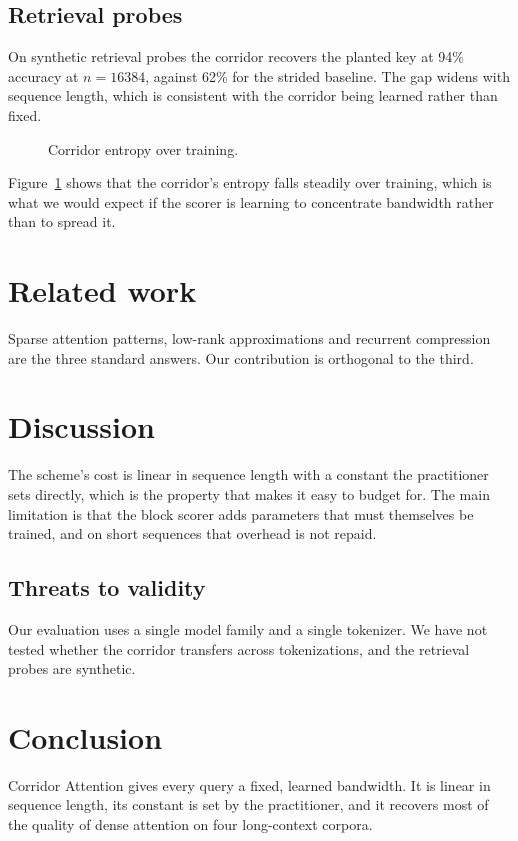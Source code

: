 \documentclass[11pt,twocolumn]{article}
\begin{document}
\subsection{Retrieval probes}
On synthetic retrieval probes the corridor recovers the planted key at 94\%
accuracy at $n=16384$, against 62\% for the strided baseline. The gap widens
with sequence length, which is consistent with the corridor being learned rather
than fixed.

\begin{figure}[t]
\centering
{}
\caption{Corridor entropy over training.}
\label{fig:entropy}
\end{figure}

Figure~\ref{fig:entropy} shows that the corridor's entropy falls steadily over
training, which is what we would expect if the scorer is learning to concentrate
bandwidth rather than to spread it.

\section{Related work}
Sparse attention patterns, low-rank approximations and recurrent compression are
the three standard answers. Our contribution is orthogonal to the third.

\section{Discussion}
The scheme's cost is linear in sequence length with a constant the practitioner
sets directly, which is the property that makes it easy to budget for. The main
limitation is that the block scorer adds parameters that must themselves be
trained, and on short sequences that overhead is not repaid.

\subsection{Threats to validity}
Our evaluation uses a single model family and a single tokenizer. We have not
tested whether the corridor transfers across tokenizations, and the retrieval
probes are synthetic.


\section{Conclusion}
Corridor Attention gives every query a fixed, learned bandwidth. It is linear in
sequence length, its constant is set by the practitioner, and it recovers most of
the quality of dense attention on four long-context corpora.
\end{document}
